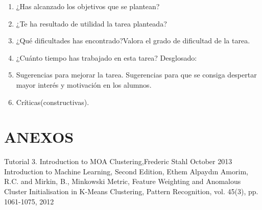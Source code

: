 \documentclass[10pt,a4paper]{article}
\begin{document}
\begin{enumerate}

	\item ¿Has alcanzado los objetivos que se plantean? 
	
	\item ¿Te ha resultado de utilidad la tarea planteada?

	\item ¿Qué dificultades has encontrado?Valora el grado de dificultad de la tarea.

	\item  ¿Cuánto tiempo has trabajado en esta tarea? Desglosado:

		\begin{table}[H]
		\centering
		\end{table}

	\item  Sugerencias para mejorar la tarea. Sugerencias para que se consiga
	despertar mayor interés y motivación en los alumnos.\par

	\item  Críticas(constructivas).

\end{enumerate} 

\newpage

\section*{ANEXOS}

\newpage



\newpage



\newpage

\begin{thebibliography}{X}
	 Tutorial 3. Introduction to MOA Clustering,Frederic Stahl
October 2013
	 Introduction to Machine Learning, Second Edition, Ethem
	Alpaydın
	 Amorim, R.C. and Mirkin, B., Minkowski
	Metric, Feature Weighting and Anomalous Cluster Initialisation in K-Means Clustering, Pattern Recognition, vol. 45(3), pp. 1061-1075, 2012
\end{thebibliography}

\end{document}
